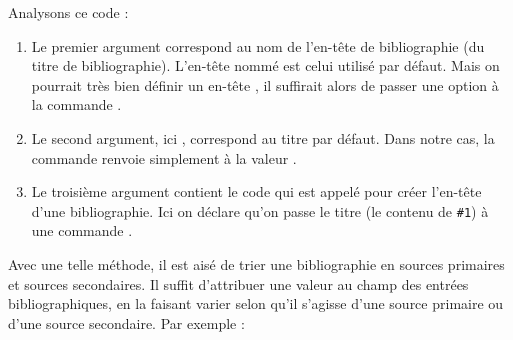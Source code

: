 Analysons ce code :
\begin{enumerate}
\item Le premier argument correspond au nom de l'en-tête de bibliographie (du titre de bibliographie). L'en-tête nommé  est celui utilisé par défaut. Mais on pourrait très bien définir un en-tête , il suffirait alors de passer une option  à la commande .


\item Le second argument, ici , correspond au titre par défaut. Dans notre cas, la commande  renvoie simplement à la valeur .
\item Le troisième argument contient le code qui est appelé pour créer l'en-tête d'une bibliographie. Ici on déclare qu'on passe le titre (le contenu de \verb|#1|) à une commande .
\end{enumerate}


Avec une telle méthode, il est aisé de trier une bibliographie en sources primaires et sources secondaires. Il suffit d'attribuer une valeur au champ  des entrées bibliographiques, en la faisant varier selon qu'il s'agisse d'une source primaire ou d'une source secondaire.
Par exemple :



